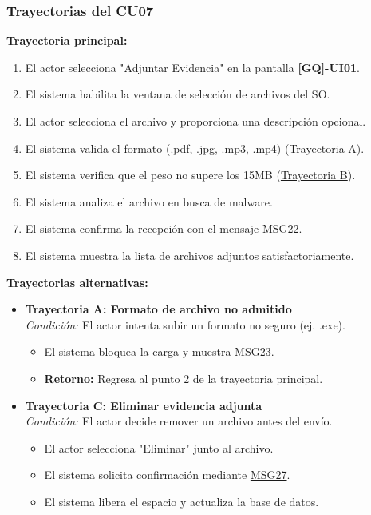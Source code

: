 \begin{appendices}
\subsubsection{Trayectorias del CU07}

\textbf{Trayectoria principal:}
\begin{enumerate}[nosep]
    \item El actor selecciona "Adjuntar Evidencia" en la pantalla \textbf{[GQ]-UI01}.
    \item El sistema habilita la ventana de selección de archivos del SO.
    \item El actor selecciona el archivo y proporciona una descripción opcional.
    \item El sistema valida el formato (.pdf, .jpg, .mp3, .mp4) (\hyperlink{msg:MSG23}{Trayectoria A}).
    \item El sistema verifica que el peso no supere los 15MB (\hyperlink{msg:MSG24}{Trayectoria B}).
    \item El sistema analiza el archivo en busca de malware.
    \item El sistema confirma la recepción con el mensaje \hyperlink{msg:MSG22}{MSG22}.
    \item El sistema muestra la lista de archivos adjuntos satisfactoriamente.
\end{enumerate}

\textbf{Trayectorias alternativas:}
\begin{itemize}[leftmargin=*]
    \item \textbf{Trayectoria A: Formato de archivo no admitido} \\
    \textit{Condición:} El actor intenta subir un formato no seguro (ej. .exe).
    \begin{itemize}[nosep]
        \item[A-1:] El sistema bloquea la carga y muestra \hyperlink{msg:MSG23}{MSG23}.
        \item \textbf{Retorno:} Regresa al punto 2 de la trayectoria principal.
    \end{itemize}
    \item \textbf{Trayectoria C: Eliminar evidencia adjunta} \\
    \textit{Condición:} El actor decide remover un archivo antes del envío.
    \begin{itemize}[nosep]
        \item[C-1:] El actor selecciona "Eliminar" junto al archivo.
        \item[C-2:] El sistema solicita confirmación mediante \hyperlink{msg:MSG27}{MSG27}.
        \item[C-3:] El sistema libera el espacio y actualiza la base de datos.
    \end{itemize}
\end{itemize}


\end{appendices}
